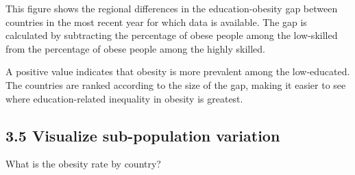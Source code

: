 \documentclass[
]{article}
\begin{document}
This figure shows the regional differences in the education-obesity gap
between countries in the most recent year for which data is available.
The gap is calculated by subtracting the percentage of obese people
among the low-skilled from the percentage of obese people among the
highly skilled.

A positive value indicates that obesity is more prevalent among the
low-educated. The countries are ranked according to the size of the gap,
making it easier to see where education-related inequality in obesity is
greatest.

\subsection{3.5 Visualize sub-population
variation}\label{visualize-sub-population-variation}

What is the obesity rate by country?
\end{document}

